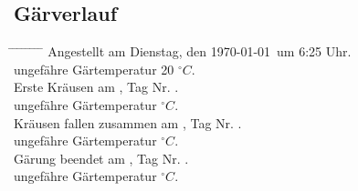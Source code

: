 \documentclass[12pt,oneside,a4paper]{scrartcl}
\begin{document}
{\subsection*{Gärverlauf}
	\begin{tabbing}
		\hspace{1cm} \= \hspace{1cm} \= \hspace{1cm} \= \hspace{1cm} \= \hspace{1cm} \= \hspace{1cm} \= \hspace{1cm} \= \hspace{1cm} \= \kill
		\> Angestellt am Dienstag, den \today \ um 6:25 Uhr.\\
		\> \> ungefähre Gärtemperatur 20 $^\circ C$.\\
		\> Erste Kräusen am \hspace{4cm}, Tag Nr.\hspace{2.5cm} .\\
		\> \> ungefähre Gärtemperatur \hspace{2.5cm}$^\circ C$.\\
		\> Kräusen fallen zusammen am \hspace{4cm}, Tag Nr. \hspace{2.5cm}.\\
		\> \> ungefähre Gärtemperatur \hspace{2.5cm}$^\circ C$.\\
		\> Gärung beendet am \hspace{4cm}, Tag Nr. \hspace{2.5cm}.\\
		\> \> ungefähre Gärtemperatur \hspace{2.5cm}$^\circ C$.
	\end{tabbing}
%
}
\end{document}
